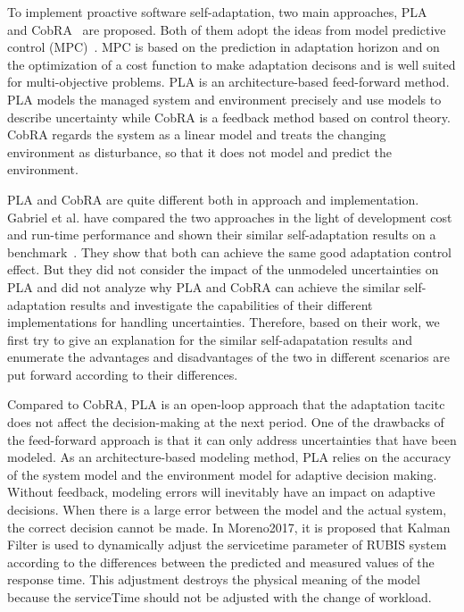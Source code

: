\documentclass[sigconf]{acmart}
\begin{document}
	
	To implement proactive software self-adaptation, two main approaches, PLA~\cite{moreno2015proactive} and CobRA~\cite{angelopoulos2016model} are proposed. Both of them adopt the ideas from model predictive control (MPC)~\cite{qin2003survey}.  MPC is based on the prediction in adaptation horizon and on the optimization of a cost function to make adaptation decisons and is well suited for multi-objective problems. 
	PLA is an architecture-based feed-forward method. PLA models the managed system and environment precisely and use models to describe uncertainty while CobRA is a feedback method based on control theory. CobRA regards the system as a linear model and treats the changing environment as disturbance, so that it does not model and predict the environment. 
	
	
	PLA and CobRA are quite different both in approach and implementation. Gabriel et al. have compared the two approaches in the light of development cost and run-time performance and shown their similar self-adaptation results on a benchmark~\cite{moreno2017comparing}. They show that both can achieve the same good adaptation control effect. But they did not consider the impact of the unmodeled uncertainties on PLA and did not analyze why PLA and CobRA can achieve the similar self-adaptation results and investigate the capabilities of their different implementations for handling uncertainties. Therefore, based on their work, we first try to give an explanation for the similar self-adapatation results and enumerate the advantages and disadvantages of the two in different scenarios are put forward according to their differences.
	
	
	Compared to CobRA, PLA is an open-loop approach that the adaptation tacitc does not affect the decision-making at the next period. One of the drawbacks of the feed-forward approach is that it can only address uncertainties that have been modeled. As an architecture-based modeling method, PLA relies on the accuracy of the system model and the environment model for adaptive decision making. Without feedback, modeling errors will inevitably have an impact on adaptive decisions. When there is a large error between the model and the actual system, the correct decision cannot be made. In Moreno2017, it is proposed that Kalman Filter is used to dynamically adjust the servicetime parameter of RUBIS system according to the differences between the predicted and measured values of the response time. This adjustment destroys the physical meaning of the model because the serviceTime should not be adjusted with the change of workload.
	
\end{document}
